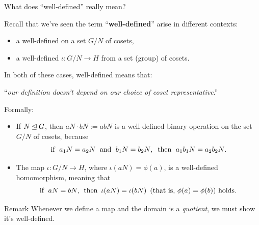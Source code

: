 \documentclass[8pt, handout]{beamer}
\newcommand{\Pause}{}      %
\begin{document}
\begin{frame}{What does ``well-defined'' really mean?} 
  
  Recall that we've seen the term ``\textbf{well-defined}'' arise in
  different contexts: \smallskip\Pause
  \begin{itemize}
  \item a well-defined  on a set $G/N$
    of cosets, \smallskip\Pause
  \item a well-defined  $\iota\colon G/N\to H$ from a
    set (group) of cosets. \Pause
  \end{itemize}
  
  \medskip
  
  In both of these cases, well-defined means that: 
  \begin{center}
    ``\emph{our definition doesn't depend on our choice of coset representative}.'' 
  \end{center}
  
  \Pause
  
  Formally:
  
  \begin{itemize}
  \item If $N\unlhd G$, then $aN\cdot bN:=abN$ is a
    {\color{blue}well-defined binary operation} on the set $G/N$ of
    cosets, \Pause because
    \[
    \text{if\; $a_1N=a_2N$\; and\; $b_1N=b_2N$},\;\;\Pause \text{then\; $a_1b_1N=a_2b_2N$}. 
    \] \vspace{-5mm}\Pause
  \item The map $\iota\colon G/N\to H$, where $\iota(aN)=\phi(a)$, is a 
    {\color{red}well-defined homomorphism}, \Pause meaning that    
    \[
    \text{if\; $aN=bN$,\; then\, $\iota(aN)=\iota(bN)$\, (that is, $\phi(a)=\phi(b)$) holds.}
    \]
  \end{itemize}
  
  \vspace{-1mm}\Pause
  
  \begin{alertblock}{Remark}
    Whenever we define a map and the domain is a \emph{quotient}, we
    must show it's well-defined.
  \end{alertblock}
  
\end{frame}

\end{document}
